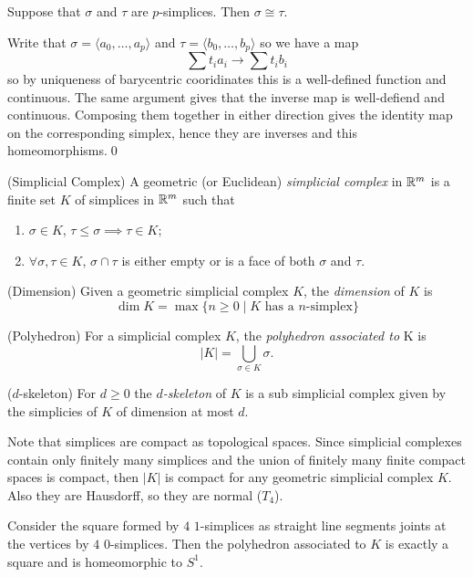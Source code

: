 \documentclass{article}
\begin{document}
\begin{lemma}
  Suppose that $ \sigma $ and $ \tau $ are $ p $-simplices. Then $ \sigma \cong \tau $.
\end{lemma}
\pf Write that $ \sigma = \langle a_0,\dots, a_p\rangle $ and $ \tau = \langle b_0,\dots, b_p\rangle $ so we have a map
\[
  \sum t_ia_i\longrightarrow \sum t_ib_i
\]
so by uniqueness of barycentric cooridinates this is a well-defined function and continuous. The same argument gives that the inverse map is well-defiend and continuous. Composing them together in either direction gives the identity map on the corresponding simplex, hence they are inverses and this homeomorphisms.\qed
\begin{definition}
	(Simplicial Complex) A geometric (or Euclidean) \textit{simplicial complex} in $ \mathbb{R}^m $ is a finite set $ K $ of simplices in $ \mathbb{R}^m $ such that 
	\begin{enumerate}
		\item $ \sigma \in K $, $ \tau\le \sigma \implies \tau \in K $;
		\item $\forall \sigma,\tau \in K $, $ \sigma\cap \tau $ is either empty or is a face of both $ \sigma $ and $ \tau $.
	\end{enumerate}
\end{definition}
\begin{definition}
	(Dimension) Given a geometric simplicial complex $ K $, the \textit{dimension} of $ K $ is
	\[
		\dim K = \max\{n \ge 0 \mid K \text{ has a } n\text{-simplex}\}
	\]
\end{definition}
\begin{definition}
	(Polyhedron) For a simplicial complex $ K $, the \textit{polyhedron associated to} K is
	\[
		|K| = \bigcup_{\sigma\in K}\sigma.
	\]
\end{definition}
\begin{definition}
	($ d $-skeleton) For $ d\ge 0 $ the $ d $\textit{-skeleton} of $ K $ is a sub simplicial complex given by the simplicies of $ K $ of dimension at most $ d $.
\end{definition}
\begin{remark}
  Note that simplices are compact as topological spaces. Since simplicial complexes contain only finitely many simplices and the union of finitely many finite compact spaces is compact, then $ |K| $ is compact for any geometric simplicial complex $ K $. Also they are Hausdorff, so they are normal ($ T_4 $).
\end{remark}
\begin{example}
  Consider the square formed by $ 4 $ $ 1 $-simplices as straight line segments joints at the vertices by $ 4 $ $ 0 $-simplices. Then the polyhedron associated to $ K $ is exactly a square and is homeomorphic to $ S^1 $.
\end{example}
\end{document}

